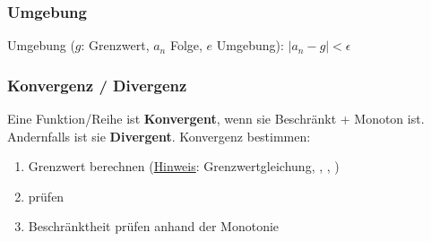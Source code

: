 \subsubsection{Umgebung}
Umgebung ($g$: Grenzwert, $a_n$ Folge, $e$ Umgebung): $\left|a_n - g\right| < \epsilon$


\subsubsection{Konvergenz / Divergenz}
Eine Funktion/Reihe ist \textbf{Konvergent}, wenn sie Beschränkt + Monoton ist. Andernfalls ist sie \textbf{Divergent}.
Konvergenz bestimmen:
\begin{enumerate}[nosep]
	\item Grenzwert berechnen (\underline{Hinweis}: Grenzwertgleichung, , , )
	\item {} prüfen 
	\item Beschränktheit prüfen anhand der Monotonie
\end{enumerate}


